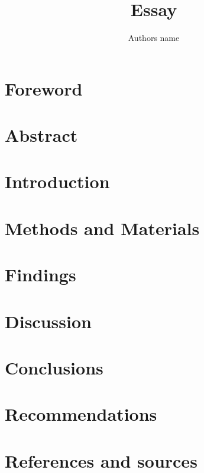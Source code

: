 \documentclass[12pt,a4paper]{article}
\title{\textbf{Essay}}
\author{Authors name}
\begin{document}
    \maketitle
    \pagebreak
    \tableofcontents
    \pagebreak
    \section{Foreword}
    \lipsum[1]
    \pagebreak
    \section{Abstract}
    \lipsum[2]
    \pagebreak
    \section{Introduction}
    \lipsum[3]
    \pagebreak
    \section{Methods and Materials}
    \lipsum[4]
    \pagebreak
    \section{Findings}
    \lipsum[5]
    \pagebreak
    \section{Discussion}
    \lipsum[6]
    \pagebreak
    \section{Conclusions}
    \lipsum[7]
    \pagebreak
    \section{Recommendations}
    \lipsum[8]
    \pagebreak
    \section{References and sources}
    \lipsum[9]
\end{document}
